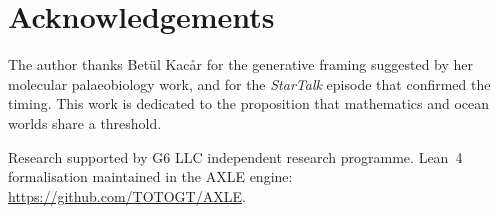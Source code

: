 \documentclass[12pt]{article}
\numberwithin{equation}{section}
\theoremstyle{remark}
\begin{document}
\section*{Acknowledgements}

The author thanks Bet{\"u}l Kac\r{a}r for the generative framing suggested by
her molecular palaeobiology work, and for the \emph{StarTalk} episode that
confirmed the timing. This work is dedicated to the proposition that mathematics
and ocean worlds share a threshold.

Research supported by G6 LLC independent research programme.
Lean~4 formalisation maintained in the AXLE engine:
\url{https://github.com/TOTOGT/AXLE}.
\end{document}
